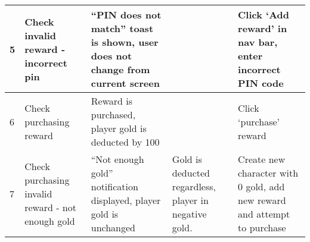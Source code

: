 \begin{landscape}
\begin{tabularx}{\linewidth}{p{1cm} X X X X}
5            & Check invalid reward - incorrect pin              & ``PIN does not match'' toast is shown, user does not change from current screen         &                                                       & Click `Add reward' in nav bar, enter incorrect PIN code                             \\ \hline
6            & Check purchasing reward                           & Reward is purchased, player gold is deducted by 100                                     &                                                       & Click `purchase' reward                                                             \\ \hline
7            & Check purchasing invalid reward - not enough gold & ``Not enough gold'' notification displayed, player gold is unchanged                    & Gold is deducted regardless, player in negative gold. & Create new character with 0 gold, add new reward and attempt to purchase            \\ \hline
\end{tabularx} 


\end{landscape}
